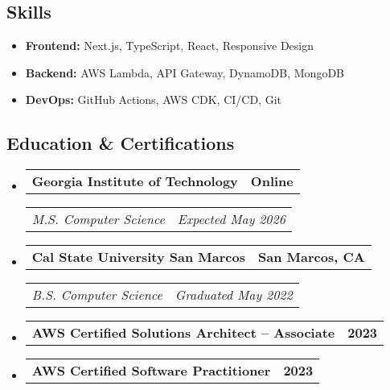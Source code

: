 \documentclass[11pt,letterpaper]{article}
\makeatletter
\newcommand{\headerrow}[2]
{\begin{tabular*}{\linewidth}{l@{\extracolsep{\fill}}r}
#1 &
#2 \\
\end{tabular*}}
\makeatother
\begin{document}
\subsection*{\Large Skills}

\begin{itemize}[leftmargin=1em,noitemsep]
    \item \textbf{Frontend:}
          Next.js, TypeScript, React, Responsive Design
    \item \textbf{Backend:}
          AWS Lambda, API Gateway, DynamoDB, MongoDB
    \item \textbf{DevOps:}
          GitHub Actions, AWS CDK, CI/CD, Git
\end{itemize}

\subsection*{\Large Education \& Certifications}

\begin{itemize}[leftmargin=1em]
    \parskip=0.1em
        
    \item
        \headerrow
        {\textbf{Georgia Institute of Technology}}
        {\textbf{Online}}
        \headerrow
        {\emph{M.S. Computer Science}}
        {\emph{Expected May 2026}}
        
    \item
        \headerrow
        {\textbf{Cal State University San Marcos}}
        {\textbf{San Marcos, CA}}
        \headerrow
        {\emph{B.S. Computer Science}}
        {\emph{Graduated May 2022}}
        
    \item
        \headerrow
        {\textbf{AWS Certified Solutions Architect -- Associate}}
        {\textbf{2023}}
        
    \item
        \headerrow
        {\textbf{AWS Certified Software Practitioner}}
        {\textbf{2023}}
\end{itemize}
\end{document}

